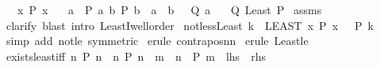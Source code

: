 \begin{isabellebody}
\ \ \ {\isachardoublequoteopen}{\isasymexists}x{\isachardot}{\kern0pt}\ P\ x{\isachardoublequoteclose}\isanewline
\ \ \ {\isachardoublequoteopen}{\isasymAnd}a{\isachardot}{\kern0pt}\ {\isasymlbrakk}\ P\ a{\isacharsemicolon}{\kern0pt}\ {\isasymforall}b{\isachardot}{\kern0pt}\ P\ b\ {\isasymlongrightarrow}\ a\ {\isasymle}\ b\ {\isasymrbrakk}\ {\isasymLongrightarrow}\ Q\ a{\isachardoublequoteclose}\isanewline
\ \ \ {\isachardoublequoteopen}Q\ {\isacharparenleft}{\kern0pt}Least\ P{\isacharparenright}{\kern0pt}{\isachardoublequoteclose}\isanewline
%
\isadelimproof
%
\endisadelimproof
%
\isatagproof
{}\isamarkupfalse%
\ assms\ \isamarkupfalse%
\ clarify\ {\isacharparenleft}{\kern0pt}blast\ intro{\isacharbang}{\kern0pt}{\isacharcolon}{\kern0pt}\ LeastI{}{\isacharunderscore}{\kern0pt}wellorder{\isacharparenright}{\kern0pt}%
\endisatagproof
{\isafoldproof}%
%
\isadelimproof
\isanewline
%
\endisadelimproof
\isanewline
{}\isamarkupfalse%
\ not{\isacharunderscore}{\kern0pt}less{\isacharunderscore}{\kern0pt}Least{\isacharcolon}{\kern0pt}\ {\isachardoublequoteopen}k\ {\isacharless}{\kern0pt}\ {\isacharparenleft}{\kern0pt}LEAST\ x{\isachardot}{\kern0pt}\ P\ x{\isacharparenright}{\kern0pt}\ {\isasymLongrightarrow}\ {\isasymnot}\ P\ k{\isachardoublequoteclose}\isanewline
%
\isadelimproof
%
\endisadelimproof
%
\isatagproof
{}\isamarkupfalse%
\ {\isacharparenleft}{\kern0pt}simp\ add{\isacharcolon}{\kern0pt}\ not{\isacharunderscore}{\kern0pt}le\ {\isacharbrackleft}{\kern0pt}symmetric{\isacharbrackright}{\kern0pt}{\isacharparenright}{\kern0pt}\isanewline
{}\isamarkupfalse%
\ {\isacharparenleft}{\kern0pt}erule\ contrapos{\isacharunderscore}{\kern0pt}nn{\isacharparenright}{\kern0pt}\isanewline
{}\isamarkupfalse%
\ {\isacharparenleft}{\kern0pt}erule\ Least{\isacharunderscore}{\kern0pt}le{\isacharparenright}{\kern0pt}\isanewline
{}\isamarkupfalse%
%
\endisatagproof
{\isafoldproof}%
%
\isadelimproof
\isanewline
%
\endisadelimproof
\isanewline
{}\isamarkupfalse%
\ exists{\isacharunderscore}{\kern0pt}least{\isacharunderscore}{\kern0pt}iff{\isacharcolon}{\kern0pt}\ {\isachardoublequoteopen}{\isacharparenleft}{\kern0pt}{\isasymexists}n{\isachardot}{\kern0pt}\ P\ n{\isacharparenright}{\kern0pt}\ {\isasymlongleftrightarrow}\ {\isacharparenleft}{\kern0pt}{\isasymexists}n{\isachardot}{\kern0pt}\ P\ n\ {\isasymand}\ {\isacharparenleft}{\kern0pt}{\isasymforall}m\ {\isacharless}{\kern0pt}\ n{\isachardot}{\kern0pt}\ {\isasymnot}\ P\ m{\isacharparenright}{\kern0pt}{\isacharparenright}{\kern0pt}{\isachardoublequoteclose}\ {\isacharparenleft}{\kern0pt}\ {\isachardoublequoteopen}{\isacharquery}{\kern0pt}lhs\ {\isasymlongleftrightarrow}\ {\isacharquery}{\kern0pt}rhs{\isachardoublequoteclose}{\isacharparenright}{\kern0pt}\isanewline

\end{isabellebody}
